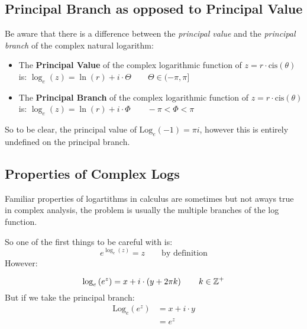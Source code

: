 \documentclass[class=article, crop=false]{standalone}
\begin{document}
\subsection{Principal Branch as opposed to Principal Value}
Be aware that there is a difference between the \textit{principal value} and the \textit{principal branch} of the complex natural logarithm:
\begin{itemize}
  \item The \textbf{Principal Value} of the complex logarithmic function of $z = r\cdot \mathrm{cis}{\left( \theta \right) }$ is:
    \subitem $\log_e{\left( z \right) } = \ln{ \left( r \right)  }+ i \cdot \Theta \qquad \Theta \in  (-\pi, \pi]$
  \item The \textbf{Principal Branch} of the complex logarithmic function of $z = r\cdot \mathrm{cis}{\left( \theta \right) }$ is:
    \subitem $\log_e{\left( z \right) } =  \ln{ \left( r \right)  +  i \cdot \Phi \qquad -\pi < \Phi < \pi }$
\end{itemize}

So to be clear, the principal value of $\mathrm{Log}_e{\left( -1 \right) } = \pi i$, however this is entirely undefined on the principal branch.



\newpage

    \subsection{Properties of Complex Logs}
    Familiar properties of logartithms in calculus are sometimes but not aways true in complex analysis, the problem is usually the multiple branches of the log function.

    So one of the first things to be careful with is:
    \[
      e^{\log_e{\left( z \right) }} = z \qquad \text{by definition}
    \]
    However:

    \[
    \log_e{\left( e^z \right) } =  x +  i \cdot \left( y +  2\pi k \right)  \qquad k \in \mathbb{Z}^+ \\
    \]
    But if we take the principal branch:
      \begin{align*}
        \mathrm{Log}_e{\left( e^z \right) } &=  x +  i \cdot  y  \\
        &= e^z
      \end{align*}
\end{document}

